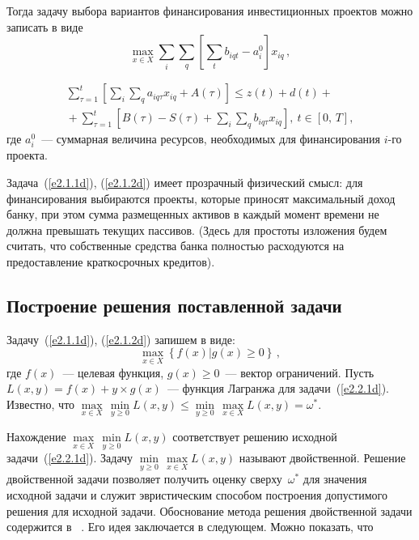 \begin{multicols}{2}
     Тогда задачу выбора вариантов финансирования инвестиционных 
проектов можно записать в виде
     \begin{equation}
     \underset{x\in X}{\max} \sum\limits_i \sum\limits_q \left[ \sum\limits_t 
b_{iqt}-a_i^0\right ] x_{iq}\,,\label{e2.1.1d}
     \end{equation}
     
     \vspace*{-12pt}
     
     \noindent
     \begin{multline}
     \sum\limits_{\tau=1}^t\left[\sum\limits_i\sum\limits_q a_{iq\tau} 
x_{iq}+A(\tau)\right] \leq z(t)+d(t)+{}\\
\!\!{}+\sum\limits_{\tau=1}^t\left[ B(\tau)-S(\tau)+\sum\limits_i\sum\limits_q 
b_{iq\tau} x_{iq}\right ]\!\!,\ t\in [0,\,T],\!\!\!
     \label{e2.1.2d}
     \end{multline}
где $a_i^0$~--- суммарная величина ресурсов, необходимых для 
финансирования $i$-го проекта.
     
     Задача~(\ref{e2.1.1d}), (\ref{e2.1.2d}) имеет прозрачный физический 
смысл: для финансирования выбираются проекты, которые приносят 
максимальный доход банку, при этом сумма размещенных активов в каждый 
момент времени не должна превышать текущих пассивов. (Здесь для 
простоты изложения будем считать, что собственные средства банка 
полностью расходуются на предоставление краткосрочных кредитов). 

\subsection{Построение решения поставленной задачи} %
     
     Задачу~(\ref{e2.1.1d}), (\ref{e2.1.2d}) запишем в виде:
     \begin{equation}
     \underset{x\in X}{\max} \left \{f(x)\vert g(x)\geq 0\right \}\,,
     \label{e2.2.1d}
     \end{equation}
где $f(x)$~--- целевая функция, $g(x)\geq 0$~--- вектор ограничений. Пусть 
$L(x,y)=f(x)+y\times g(x)$~--- функция Лагранжа для задачи~(\ref{e2.2.1d}). 
Известно, что $\underset{x\in X}{\max}\,\underset{y\geq 0}{\min} L(x,y) \leq 
\underset{y\geq 0}{\min}\,\underset{x\in X}{\max} L(x,y)=\omega^*$.
     
     Нахождение $\underset{x\in X}{\max}\,\underset{y\geq 0}{\min} L(x,y)$ 
соответствует решению исходной задачи~(\ref{e2.2.1d}). Задачу 
$\underset{y\geq 0}{\min}\,\underset{x\in X}{\max} L(x,y)$ называют 
двойственной. Решение двойственной задачи позволяет получить оценку 
сверху~$\omega^*$ для значения исходной задачи и служит эвристическим 
способом построения допустимого решения для исходной задачи. 
Обоснование метода решения двойственной задачи содержится 
     в~\cite{1-dem} . Его идея заключается в следующем. Можно показать, 
что
\vspace*{-8pt}


\end{multicols}
